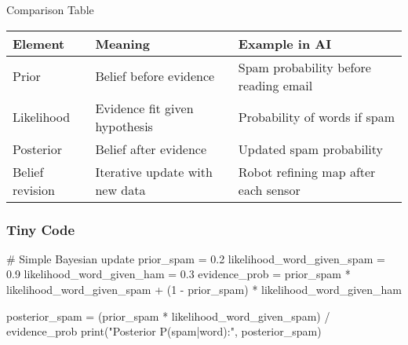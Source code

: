 \documentclass[
  letterpaper,
  DIV=11,
  numbers=noendperiod]{scrreprt}
\newenvironment{Shaded}{\begin{snugshade}}{\end{snugshade}}
\newcommand{\BuiltInTok}[1]{\textcolor[rgb]{0.00,0.23,0.31}{#1}}
\newcommand{\CommentTok}[1]{\textcolor[rgb]{0.37,0.37,0.37}{#1}}
\newcommand{\DecValTok}[1]{\textcolor[rgb]{0.68,0.00,0.00}{#1}}
\newcommand{\FloatTok}[1]{\textcolor[rgb]{0.68,0.00,0.00}{#1}}
\newcommand{\NormalTok}[1]{\textcolor[rgb]{0.00,0.23,0.31}{#1}}
\newcommand{\OperatorTok}[1]{\textcolor[rgb]{0.37,0.37,0.37}{#1}}
\newcommand{\StringTok}[1]{\textcolor[rgb]{0.13,0.47,0.30}{#1}}
\begin{document}
Comparison Table

\begin{longtable}[]{@{}
  >{\raggedright\arraybackslash}p{}
  >{\raggedright\arraybackslash}p{}
  >{\raggedright\arraybackslash}p{}@{}}
\toprule\noalign{}
\begin{minipage}[b]{\linewidth}\raggedright
Element
\end{minipage} & \begin{minipage}[b]{\linewidth}\raggedright
Meaning
\end{minipage} & \begin{minipage}[b]{\linewidth}\raggedright
Example in AI
\end{minipage} \\
\midrule\noalign{}
\endhead
\bottomrule\noalign{}
\endlastfoot
Prior & Belief before evidence & Spam probability before reading
email \\
Likelihood & Evidence fit given hypothesis & Probability of words if
spam \\
Posterior & Belief after evidence & Updated spam probability \\
Belief revision & Iterative update with new data & Robot refining map
after each sensor \\
\end{longtable}

\subsubsection{Tiny Code}\label{tiny-code-26}

\begin{Shaded}
\begin{Highlighting}[]
\CommentTok{\# Simple Bayesian update}
\NormalTok{prior\_spam }\OperatorTok{=} \FloatTok{0.2}
\NormalTok{likelihood\_word\_given\_spam }\OperatorTok{=} \FloatTok{0.9}
\NormalTok{likelihood\_word\_given\_ham }\OperatorTok{=} \FloatTok{0.3}
\NormalTok{evidence\_prob }\OperatorTok{=}\NormalTok{ prior\_spam }\OperatorTok{*}\NormalTok{ likelihood\_word\_given\_spam }\OperatorTok{+}\NormalTok{ (}\DecValTok{1} \OperatorTok{{-}}\NormalTok{ prior\_spam) }\OperatorTok{*}\NormalTok{ likelihood\_word\_given\_ham}

\NormalTok{posterior\_spam }\OperatorTok{=}\NormalTok{ (prior\_spam }\OperatorTok{*}\NormalTok{ likelihood\_word\_given\_spam) }\OperatorTok{/}\NormalTok{ evidence\_prob}
\BuiltInTok{print}\NormalTok{(}\StringTok{"Posterior P(spam|word):"}\NormalTok{, posterior\_spam)}
\end{Highlighting}
\end{Shaded}
\end{document}
